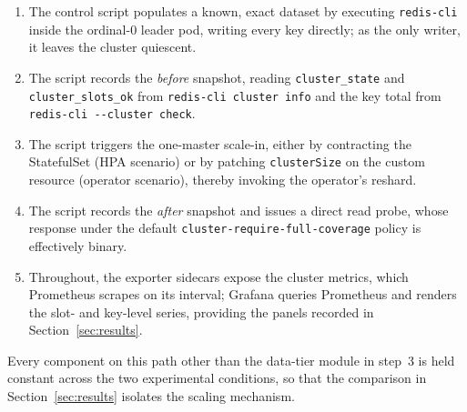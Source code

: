 \begin{enumerate}
    \item The control script populates a known, exact dataset by executing
    \texttt{redis-cli} inside the ordinal-$0$ leader pod, writing every key directly; as the
    only writer, it leaves the cluster quiescent.
    \item The script records the \emph{before} snapshot, reading \texttt{cluster\_state} and
    \texttt{cluster\_slots\_ok} from \texttt{redis-cli cluster info} and the key total from
    \texttt{redis-cli -{}-cluster check}.
    \item The script triggers the one-master scale-in, either by contracting the StatefulSet
    (HPA scenario) or by patching \texttt{clusterSize} on the custom resource (operator
    scenario), thereby invoking the operator's reshard.
    \item The script records the \emph{after} snapshot and issues a direct read probe, whose
    response under the default \texttt{cluster-require-full-coverage} policy is effectively
    binary.
    \item Throughout, the exporter sidecars expose the cluster metrics, which Prometheus
    scrapes on its interval; Grafana queries Prometheus and renders the slot- and key-level
    series, providing the panels recorded in Section~\ref{sec:results}.
\end{enumerate}

Every component on this path other than the data-tier module in step~3 is held constant
across the two experimental conditions, so that the comparison in Section~\ref{sec:results}
isolates the scaling mechanism.
